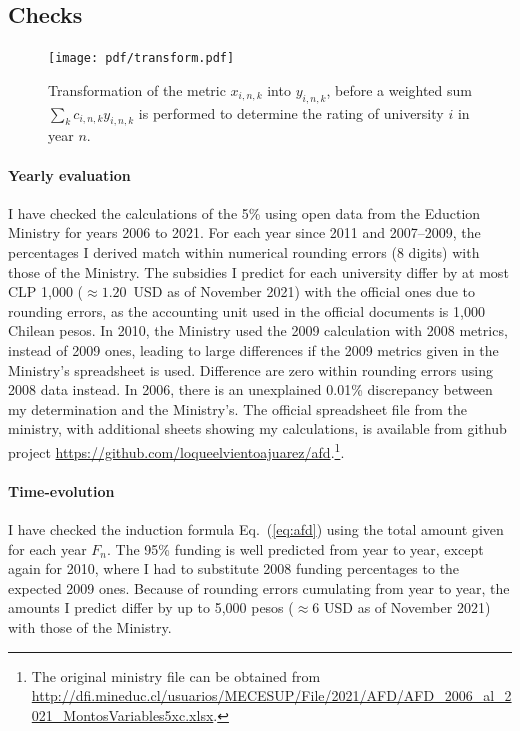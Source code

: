 \documentclass[twocolumn]{article}
\def\eqref#1{Eq.~(\ref{eq:#1})}
\begin{document}
\subsection{Checks}
\begin{figure}
\centering
\texttt{[image: pdf/transform.pdf]}
\caption{Transformation of the metric $x_{i,n,k}$ into $y_{i,n,k}$, before a weighted sum 
$\sum_k c_{i,n,k} y_{i,n,k}$ is performed to determine the rating of university $i$ in year $n$.}
\label{fig:transform}
\end{figure}

\paragraph{Yearly evaluation} I have checked the calculations of the 5\% using open data from the Eduction Ministry for years 2006 to 2021. For each year since 2011 and 2007--2009, the percentages I
derived match within numerical rounding errors (8 digits) with those of the Ministry. The subsidies I predict for each university differ by at most CLP 1,000 ($\approx 1.20$~USD as of November 2021) with the official ones due to rounding errors, as the accounting unit used in the
official documents is 1,000 Chilean pesos. In 2010, the Ministry used the 2009
calculation with 2008 metrics, instead of 2009 ones, leading to large differences if the 2009 metrics given in the Ministry's spreadsheet is used.  Difference are zero within rounding errors using 2008 data instead. In 2006, there is an unexplained 0.01\% discrepancy between my determination and the Ministry's.  The official spreadsheet file from the ministry, with additional sheets showing my calculations, is available from github project \url{https://github.com/loqueelvientoajuarez/afd}.\footnote{The original ministry file can
be obtained from \url{http://dfi.mineduc.cl/usuarios/MECESUP/File/2021/AFD/AFD_2006_al_2021_MontosVariables5xc.xlsx}.}. 

\paragraph{Time-evolution} I have checked the induction formula \eqref{afd} using the total amount given for each year $F_n$.  The 95\% funding is well predicted from year to year, except again for 2010, where I had to substitute 2008 funding percentages to the expected 2009 ones. Because of rounding errors cumulating from year to year, the amounts I predict differ by up to 5,000 pesos ($\approx 6$ USD as of November 2021) with those of the Ministry.
\end{document}
